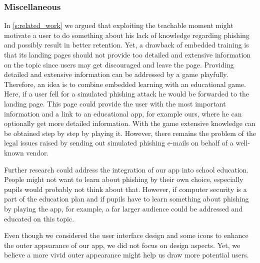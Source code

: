 \subsubsection{Miscellaneous}
\begin{description}[leftmargin=0cm]
\item[Combination of Embedded Training and an Education Application:] In \autoref{s:related_work} we argued that exploiting the teachable moment might motivate a user to do something about his lack of knowledge regarding phishing and possibly result in better retention.
	Yet, a drawback of embedded training is that its landing pages should not provide too detailed and extensive information on the topic since users may get discouraged and leave the page.
	Providing detailed and extensive information can be addressed by a game playfully.
	Therefore, an idea is to combine embedded learning with an educational game.
	Here, if a user fell for a simulated phishing attack he would be forwarded to the landing page.
	This page could provide the user with the most important information and a link to an educational app, for example ours, where he can optionally get more detailed information.
	With the game extensive knowledge can be obtained step by step by playing it.
However, there remains the problem of the legal issues raised by sending out simulated phishing e-mails on behalf of a well-known vendor.

\item[Integration of App into School Education]
Further research could address the integration of our app into school education.
People might not want to learn about phishing by their own choice, especially pupils would probably not think about that.
However, if computer security is a part of the education plan and if pupils have to learn something about phishing by playing the app, for example, a far larger audience could be addressed and educated on this topic.

\item[More Appealing Outer Appearance]
Even though we considered the user interface design and some icons to enhance the outer appearance of our app, we did not focus on design aspects.
Yet, we believe a more vivid outer appearance might help us draw more potential users.
\end{description}

